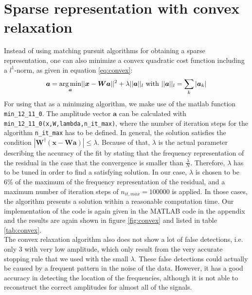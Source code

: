 \section{Sparse representation with convex relaxation}
Instead of using matching pursuit algorithms for obtaining a sparse representation, one can also minimize a convex quadratic cost function including a $l^{1}$-norm, as given in equation \ref{eq:convex}:
\begin{equation}
\boldsymbol{a}=\underset{\boldsymbol{a}}{\operatorname*{arg\,min}} ||\boldsymbol{x} - \boldsymbol{Wa} ||^{2} +\lambda ||\boldsymbol{a}||_{l} \text{ with } ||\boldsymbol{a}||_{l} =\sum_{k}|\boldsymbol{a}_{k} |
\label{eq:convex}
\end{equation}
For using that as a minimzing algorithm, we make use of the matlab function \texttt{min\_12\_11\_0}. The amplitude vector $\boldsymbol{a}$ can be calculated with \texttt{min\_12\_11\_0(x,W,lambda,n\_it\_max)}, where the number of iteration steps for the algorithm \texttt{n\_it\_max} has to be defined. In general, the solution satisfies the condition $|\boldsymbol{W}^{\dag}\left(\boldsymbol{x}-\boldsymbol{Wa} \right)| \leq\lambda $. Because of that, $\lambda$ is the actual parameter describing the accuracy of the fit by stating that the frequency representation of the residual in the case that the convergence is smaller than $\frac{\lambda}{N}$. Therefore, $\lambda$ has to be tuned in order to find a satisfying solution. In our case, $\lambda $ is chosen to be 6\% of the maximum of the frequency representation of the residual, and a maximum number of iteration steps of $n_{it,max}= 100000$ is applied. In those cases, the algorithm presents a solution within a reasonable computation time. Our implementation of the code is again given in the MATLAB code in the appendix and the results are again shown in figure \ref{fig:convex} and listed in table \ref{tab:convex}.\\
The convex relaxation algorithm also does not show a lot of false detections, i.e. only 3 with very low amplitude, which only result from the very accurate stopping rule that we used with the small $\lambda$. These false detections could actually be caused by a frequent pattern in the noise of the data. However, it has a good accuracy in detecting the location of the frequencies, although it is not able to reconstruct the correct amplitudes for almost all of the signals.


